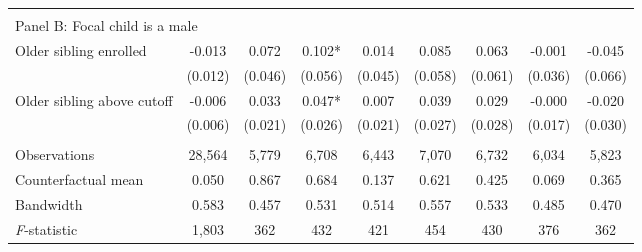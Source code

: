 {{\begin{tabular}{lcccccccc}
&  &  &  & & & & & \\
\multicolumn{10}{l}{Panel B: Focal child is a male} \\
Older sibling enrolled&      -0.013   &       0.072   &       0.102*  &       0.014   &       0.085   &       0.063   &      -0.001   &      -0.045   \\
                    &     (0.012)   &     (0.046)   &     (0.056)   &     (0.045)   &     (0.058)   &     (0.061)   &     (0.036)   &     (0.066)   \\
 
Older sibling above cutoff&      -0.006   &       0.033   &       0.047*  &       0.007   &       0.039   &       0.029   &      -0.000   &      -0.020   \\
                    &     (0.006)   &     (0.021)   &     (0.026)   &     (0.021)   &     (0.027)   &     (0.028)   &     (0.017)   &     (0.030)   \\
                    &               &               &               &               &               &               &               &               \\
Observations        &      28,564   &       5,779   &       6,708   &       6,443   &       7,070   &       6,732   &       6,034   &       5,823   \\
Counterfactual mean &       0.050   &       0.867   &       0.684   &       0.137   &       0.621   &       0.425   &       0.069   &       0.365   \\
Bandwidth           &       0.583   &       0.457   &       0.531   &       0.514   &       0.557   &       0.533   &       0.485   &       0.470   \\
\textit{F}-statistic&       1,803   &         362   &         432   &         421   &         454   &         430   &         376   &         362   \\
 

\bottomrule
\end{tabular}
}
}

